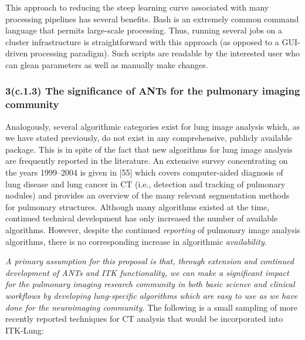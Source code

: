 \documentclass[11pt,]{article}
\begin{document}
This approach to reducing the steep learning curve associated with many
processing pipelines has several benefits. Bash is an extremely common
command language that permits large-scale processing. Thus, running
several jobs on a cluster infrastructure is straightforward with this
approach (as opposed to a GUI-driven processing paradigm). Such scripts
are readable by the interested user who can glean parameters as well as
manually make changes.

\subsubsection{3(c.1.3) The significance of ANTs for the pulmonary
imaging
community}\label{c.1.3-the-significance-of-ants-for-the-pulmonary-imaging-community}

Analogously, several algorithmic categories exist for lung image
analysis which, as we have stated previously, do not exist in any
comprehensive, publicly available package. This is in spite of the fact
that new algorithms for lung image analysis are frequently reported in
the literature. An extensive survey concentrating on the years
1999--2004 is given in {[}55{]} which covers computer-aided diagnosis of
lung disease and lung cancer in CT (i.e., detection and tracking of
pulmonary nodules) and provides an overview of the many relevant
segmentation methods for pulmonary structures. Although many algorithms
existed at the time, continued technical development has only increased
the number of available algorithms. However, despite the continued
\emph{reporting} of pulmonary image analysis algorithms, there is no
corresponding increase in algorithmic \emph{availability}.

\emph{A primary assumption for this proposal is that, through extension
and continued development of ANTs and ITK functionality, we can make a
significant impact for the pulmonary imaging research community in both
basic science and clinical workflows by developing lung-specific
algorithms which are easy to use as we have done for the neuroimaging
community.} The following is a small sampling of more recently reported
techniques for CT analysis that would be incorporated into ITK-Lung:
\end{document}
